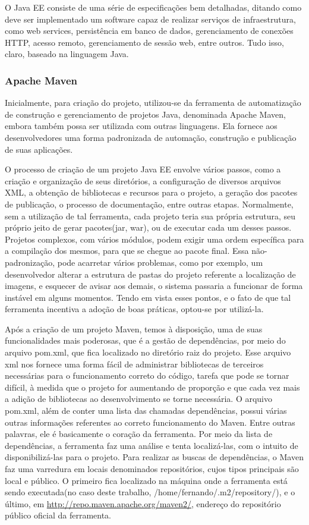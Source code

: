 \documentclass[12pt]{article}
\begin{document}
O Java EE consiste de uma série de especificações bem detalhadas, ditando como deve ser implementado um software capaz de realizar serviços de infraestrutura, como web services, persistência em banco de dados, gerenciamento de conexões HTTP, acesso remoto, gerenciamento de sessão web, entre outros. Tudo isso, claro, baseado na linguagem Java.

\subsubsection{Apache Maven}

Inicialmente, para criação do projeto, utilizou-se da ferramenta de automatização de construção e gerenciamento de projetos Java, denominada Apache Maven, embora também possa ser utilizada com outras linguagens. Ela fornece aos desenvolvedores uma forma padronizada de automação, construção e publicação de suas aplicações.

O processo de criação de um projeto Java EE envolve vários passos, como a criação e organização de seus diretórios, a configuração de diversos arquivos XML, a obtenção de bibliotecas e recursos para o projeto, a geração dos pacotes de publicação, o processo de documentação, entre outras etapas. Normalmente, sem a utilização de tal ferramenta, cada projeto teria sua própria estrutura, seu próprio jeito de gerar pacotes(jar, war), ou de executar cada um desses passos. Projetos complexos, com vários módulos, podem exigir uma ordem específica para a compilação dos mesmos, para que se chegue ao pacote final. Essa não-padronização, pode acarretar vários problemas, como por exemplo, um desenvolvedor alterar a estrutura de pastas do projeto referente a localização de imagens, e esquecer de avisar aos demais, o sistema passaria a funcionar de forma instável em alguns momentos. Tendo em vista esses pontos, e o fato de que tal ferramenta incentiva a adoção de boas práticas, optou-se por utilizá-la.

Após a criação de um projeto Maven, temos à disposição, uma de suas funcionalidades mais poderosas, que é a gestão de dependências, por meio do arquivo pom.xml, que fica localizado no diretório raiz do projeto. Esse arquivo xml nos fornece uma forma fácil de administrar bibliotecas de terceiros necessárias para o funcionamento correto do código, tarefa que pode se tornar difícil, à medida que o projeto for aumentando de proporção e que cada vez mais a adição de bibliotecas ao desenvolvimento se torne necessária. O arquivo pom.xml, além de conter uma lista das chamadas dependências, possui várias outras informações referentes ao correto funcionamento do Maven. Entre outras palavras, ele é basicamente o coração da ferramenta. 
Por meio da lista de dependências, a ferramenta faz uma análise e tenta localizá-las, com o intuito de disponibilizá-las para o projeto. Para realizar as buscas de dependências, o Maven faz uma varredura em locais denominados repositórios, cujos tipos principais são local e público. O primeiro fica localizado na máquina onde a ferramenta está sendo executada(no caso deste trabalho, /home/fernando/.m2/repository/), e o último, em \url{http://repo.maven.apache.org/maven2/}, endereço do repositório público oficial da ferramenta.
\end{document}
